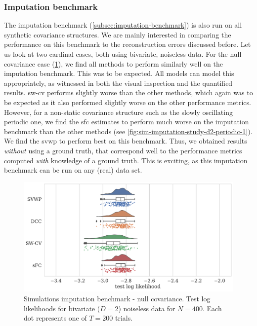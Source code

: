 \subsubsection{Imputation benchmark}

The imputation benchmark (\cref{subsec:imputation-benchmark}) is also run on all synthetic covariance structures.
We are mainly interested in comparing the performance on this benchmark to the reconstruction errors discussed before.
%
Let us look at two cardinal cases, both using bivariate, noiseless data.
For the null covariance case (\cref{fig:sim-imputation-study-d2-null}), we find all methods to perform similarly well on the imputation benchmark.
This was to be expected.
All models can model this appropriately, as witnessed in both the visual inspection and the quantified results.
\gls{sw-cv} performs slightly worse than the other methods, which again was to be expected as it also performed slightly worse on the other performance metrics.
However, for a non-static covariance structure such as the slowly oscillating periodic one, we find the \gls{sfc} estimates to perform much worse on the imputation benchmark than the other methods (see \cref{fig:sim-imputation-study-d2-periodic-1}).
We find the \gls{svwp} to perform best on this benchmark.
Thus, we obtained results \emph{without} using a ground truth, that correspond well to the performance metrics computed \emph{with} knowledge of a ground truth.
This is exciting, as this imputation benchmark can be run on any (real) data set.


\begin{figure}[t]
  \centering
  \includegraphics[width=\textwidth]{fig/sim/d2/N0400_T0200/imputation_study/LEOO_no_noise_test_log_likelihoods_raincloud_null}
  \caption{
    Simulations imputation benchmark - null covariance.
    Test log likelihoods for bivariate ($D = 2$) noiseless data for $N = 400$.
    Each dot represents one of $T = 200$ trials.
  }\label{fig:sim-imputation-study-d2-null}
\end{figure}


